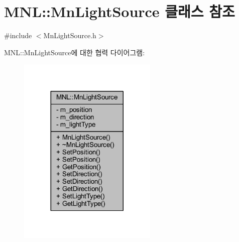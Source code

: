 \hypertarget{class_m_n_l_1_1_mn_light_source}{}\section{M\+NL\+:\+:Mn\+Light\+Source 클래스 참조}
\label{class_m_n_l_1_1_mn_light_source}


{\ttfamily \#include $<$Mn\+Light\+Source.\+h$>$}



M\+NL\+:\+:Mn\+Light\+Source에 대한 협력 다이어그램\+:\nopagebreak
\begin{figure}[H]
\begin{center}
\leavevmode
\includegraphics[width=188pt]{class_m_n_l_1_1_mn_light_source__coll__graph}
\end{center}
\end{figure}

